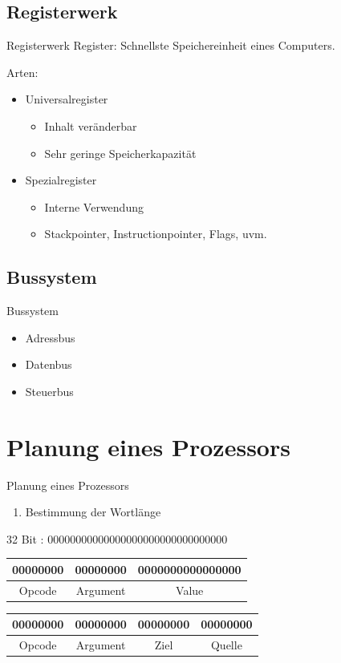 \documentclass{beamer}
\begin{document}
\subsection{Registerwerk}
\begin{frame}[t]{Registerwerk}
Register: Schnellste Speichereinheit eines Computers.
\par\smallskip
Arten:
\begin{itemize}
\item Universalregister
\begin{itemize}
\item Inhalt ver\"anderbar
\item Sehr geringe Speicherkapazit\"at
\smallskip
\end{itemize}
\item Spezialregister
\begin{itemize}
\item Interne Verwendung
\item Stackpointer, Instructionpointer, Flags, uvm.
\end{itemize}
\end{itemize}
\end{frame}

\subsection{Bussystem}
\begin{frame}{Bussystem}
\centering
\begin{itemize}
\item Adressbus
\bigskip
\item Datenbus
\bigskip
\item Steuerbus
\end{itemize}
\end{frame}
\iffalse
\section{Planung eines Prozessors}

\begin{frame}[t]{Planung eines Prozessors}
\begin{enumerate}
\item{Bestimmung der Wortl\"ange}
\end{enumerate}
32 Bit : 00000000000000000000000000000000
\centering 
\pause
\begin{table}[]
\centering
\begin{tabular}{|c|c|c|}
\hline
00000000 & 00000000 & 0000000000000000 \\ \hline
Opcode   & Argument & Value            \\ \hline
\end{tabular}
\end{table}
\smallskip
\pause
\centering
\begin{table}[]
\centering
\begin{tabular}{|c|c|c|c|}
\hline
00000000 & 00000000 & 00000000 & 00000000 \\ \hline
Opcode   & Argument & Ziel     & Quelle   \\ \hline
\end{tabular}
\end{table}
\end{frame}
\end{document}
